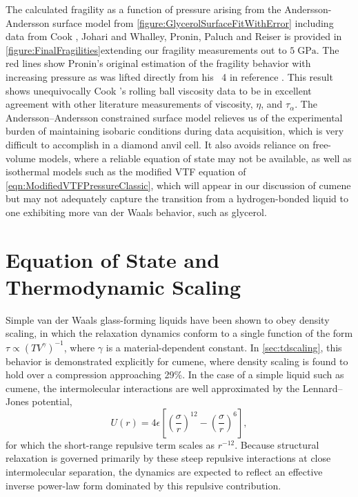 The calculated fragility as a function of pressure arising from the Andersson-Andersson surface model from \fig \nolinebreak \ref{figure:GlycerolSurfaceFitWithError} including data from Cook \etal, Johari and Whalley, Pronin, Paluch and Reiser \etal is provided in \fig \ref{figure:FinalFragilities}\textemdash extending our fragility measurements out to $5\;\si{\giga\pascal}$.  The red lines show Pronin's original estimation of the fragility behavior with increasing pressure as was lifted directly from his \fig~4 in reference \nolinebreak \cite{Pronin}. This result shows unequivocally Cook \etal's rolling ball viscosity data to be in excellent agreement with other literature measurements of viscosity, $\eta$, and $\tau_\alpha$.  The Andersson--Andersson constrained surface model relieves us of the experimental burden of maintaining isobaric conditions during data acquisition, which is very difficult to accomplish in a diamond anvil cell. It also avoids reliance on free-volume models, where a reliable equation of state may not be available, as well as isothermal models such as the modified VTF equation of \eqn \ref{eqn:ModifiedVTFPressureClassic}, which will appear in our discussion of cumene but may not adequately capture the transition from a hydrogen-bonded liquid to one exhibiting more van der Waals behavior, such as glycerol.

\section{Equation of State and Thermodynamic Scaling} \label{sec:GlycerolScaling}

Simple van der Waals glass-forming liquids have been shown to obey density scaling, in which the relaxation dynamics conform to a single function of the form $\tau \propto (T V^\gamma)^{-1}$, where $\gamma$ is a material-dependent constant. In \sect\nolinebreak \ref{sec:tdscaling}, this behavior is demonstrated explicitly for cumene, where density scaling is found to hold over a compression approaching 29\%. In the case of a simple liquid such as cumene, the intermolecular interactions are well approximated by the Lennard--Jones potential,
\begin{equation}
	U(r)=4\epsilon\left[\left(\frac{\sigma}{r}\right)^{12}-\left(\frac{\sigma}{r}\right)^6\right],
	\label{eqn:LennardJones}
\end{equation}
for which the short-range repulsive term scales as $r^{-12}$. Because structural relaxation is governed primarily by these steep repulsive interactions at close intermolecular separation, the dynamics are expected to reflect an effective inverse power-law form dominated by this repulsive contribution.

